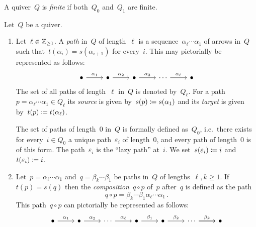 \begin{definition*}
  A quiver~$Q$ is \emph{finite} if both~$Q_0$ and~$Q_1$ are finite.
\end{definition*}


\begin{definition}
  Let~$Q$ be a quiver.
  \begin{enumerate}
    \item
      Let~$\ell \in \mathbb{Z}_{\geq 1}$.
      A \emph{path} in~$Q$ of length~$\ell$ is a sequence~$\alpha_\ell \dotsm \alpha_1$ of arrows in~$Q$ such that~$t(\alpha_i) = s(\alpha_{i+1})$ for every~$i$.
      This may pictorially be represented as follows:
      \[
        \begin{tikzcd}
            \bullet
            \arrow{r}[above]{\alpha_1}
          & \bullet
            \arrow{r}[above]{\alpha_2}
          & \bullet
            \arrow{r}[above]{\alpha_3}
          & \cdots
            \arrow{r}[above]{\alpha_\ell}
          & \bullet
        \end{tikzcd}
      \]
      The set of all paths of length~$\ell$ in~$Q$ is denoted by~$Q_\ell$.
      For a path~$p = \alpha_\ell \dotsm \alpha_1 \in Q_\ell$ its \emph{source} is given by~$s(p) \coloneqq s(\alpha_1)$ and its \emph{target} is given by~$t(p) \coloneqq t(\alpha_\ell)$.
      
      The set of paths of length~$0$ in~$Q$ is formally defined as~$Q_0$, i.e.\ there exists for every~$i \in Q_0$ a unique path~$\varepsilon_i$ of length~$0$, and every path of length~$0$ is of this form.
      The path~$\varepsilon_i$ is the \enquote{lazy path} at~$i$.
      We set~$s(\varepsilon_i) \coloneqq i$ and~$t(\varepsilon_i) \coloneqq i$.
    \item
      Let~$p = \alpha_\ell \dotsm \alpha_1$ and~$q = \beta_k \dotsm \beta_1$ be paths in~$Q$ of lengths~$\ell, k \geq 1$.
      If~$t(p) = s(q)$ then the \emph{composition}~$q \circ p$ of~$p$ after~$q$ is defined as the path
      \[
          q \circ p
        = \beta_k \dotsm \beta_1 \alpha_\ell \dotsm \alpha_1 \,.
      \]
      This path~$q \circ p$ can pictorially be represented as follows:
      \[
        \begin{tikzcd}
            \bullet
            \arrow{r}[above]{\alpha_1}
          & \bullet
            \arrow{r}[above]{\alpha_2}
          & \cdots
            \arrow{r}[above]{\alpha_\ell}
          & \bullet
            \arrow{r}[above]{\beta_1}
          & \bullet
            \arrow{r}[above]{\beta_2}
          & \cdots
            \arrow{r}
            \arrow{r}[above]{\beta_k}
          & \bullet
        \end{tikzcd}
      \]
      

\end{enumerate}
\end{definition}
